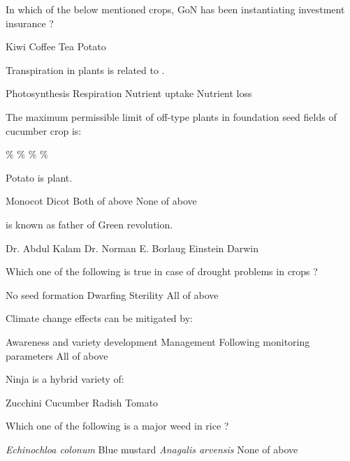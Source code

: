 \begin{questions}
\question In which of the below mentioned crops, GoN has been instantiating investment insurance ?
  \begin{choices}
  \choice Kiwi
  \choice Coffee
  \choice Tea
  \choice Potato
  \end{choices}

\question Transpiration in plants is related to \fillin[][3cm].
  \begin{choices}
  \choice Photosynthesis
  \choice Respiration
  \choice Nutrient uptake
  \choice Nutrient loss
  \end{choices}

\question The maximum permissible limit of off-type plants in foundation seed fields of cucumber crop is:
  \begin{choices}
  \%
  \%
  \%
  \%
  \end{choices}

\question Potato is \fillin[][3cm] plant.
  \begin{choices}
  \choice Monocot
  \choice Dicot
  \choice Both of above
  \choice None of above
  \end{choices}

\question \fillin[][4cm] is known as father of Green revolution.
  \begin{choices}
  \choice Dr. Abdul Kalam
  \choice Dr. Norman E. Borlaug
  \choice Einstein
  \choice Darwin
  \end{choices}

\question Which one of the following is true in case of drought problems in crops ?
  \begin{choices}
  \choice No seed formation
  \choice Dwarfing
  \choice Sterility
  \choice All of above
  \end{choices}

\question Climate change effects can be mitigated by:
  \begin{choices}
  \choice Awareness and variety development
  \choice Management
  \choice Following monitoring parameters
  \choice All of above
  \end{choices}

\question Ninja is a hybrid variety of:
  \begin{choices}
  \choice Zucchini
  \choice Cucumber
  \choice Radish
  \choice Tomato
  \end{choices}

\question Which one of the following is a major weed in rice ?
  \begin{choices}
  \choice \textit{Echinochloa colonum}
  \choice Blue mustard
  \choice \textit{Anagalis arvensis}
  \choice None of above
  \end{choices}

\end{questions}
